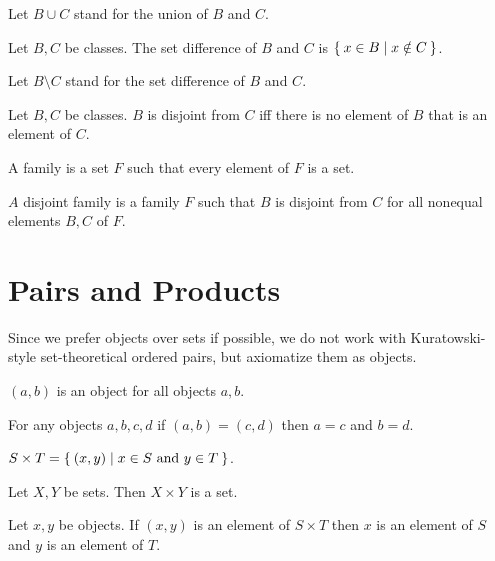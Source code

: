 \documentclass[11pt]{article}
\begin{document}
\begin{forthel}
  Let $B \cup C$ stand for the union of $B$ and $C$.

  \begin{definition}
    Let $B, C$ be classes.
    The set difference of $B$ and $C$ is $\Set{x \in B | x \notin C}$.
  \end{definition}

  Let $B \setminus C$ stand for the set difference of $B$ and $C$.

  \begin{definition}
    Let $B, C$ be classes.
    $B$ is disjoint from $C$ iff there is no element of $B$ that is an element
    of $C$.
  \end{definition}

  \begin{definition}
    A family is a set $F$ such that every element of $F$ is a set.
  \end{definition}

  \begin{definition}
    $A$ disjoint family is a family $F$ such that $B$ is disjoint from $C$ for
    all nonequal elements $B, C$ of $F$.
  \end{definition}
\end{forthel}


\section{Pairs and Products}

Since we prefer objects over sets if possible, we do not work
with Kuratowski-style set-theoretical ordered pairs, but
axiomatize them as objects.

\begin{forthel}
  \begin{axiom}
    $(a,b)$ is an object for all objects $a, b$.
  \end{axiom}

  \begin{axiom}
    For any objects $a, b, c, d$ if $(a,b) = (c,d)$ then $a = c$ and $b = d$.
  \end{axiom}

  \begin{definition}
    $S \times T = \Set{(x,y) | \text{$x \in S$ and $y \in T$}}$.
  \end{definition}

  \begin{axiom}
    Let $X, Y$ be sets.
    Then $X \times Y$ is a set.
  \end{axiom}

  \begin{axiom}
    Let $x, y$ be objects.
    If $(x,y)$ is an element of $S \times T$ then $x$ is an element of $S$ and
    $y$ is an element of $T$.
  \end{axiom}
\end{forthel}
\end{document}
